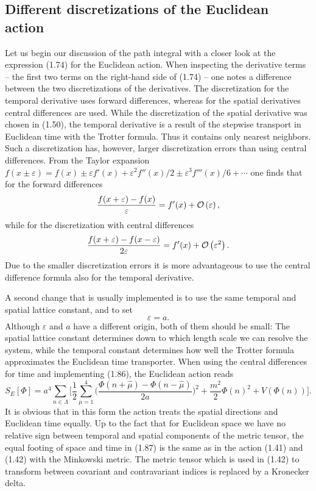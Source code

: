 \subsection{Different discretizations of the Euclidean action}

Let us begin our discussion of the path integral with a closer look at the
expression (1.74) for the Euclidean action. When inspecting the derivative
terms -- the first two terms on the right-hand side of (1.74) -- one notes a
difference between the two discretizations of the derivatives. The
discretization for the temporal derivative uses forward differences, whereas
for the spatial derivatives central differences are used. While the
discretization of the spatial derivative was chosen in (1.50), the temporal
derivative is a result of the stepwise transport in Euclidean time with the
Trotter formula. Thus it contains only nearest neighbors. Such a discretization
has, however, larger discretization errors than using central differences. From
the Taylor expansion $f(x \pm \varepsilon) = f(x) \pm \varepsilon f'(x)
+ \varepsilon^2 f''(x)/2 \pm \varepsilon^3 f'''(x)/6 + \cdots$ one finds that
for the forward differences
\begin{equation}
  \frac{f(x+\varepsilon) - f(x)}{\varepsilon} = f'(x) + \mathcal{O}\left(\varepsilon\right),
\end{equation}
while for the discretization with central differences
\begin{equation}
  \frac{f(x+\varepsilon) - f(x-\varepsilon)}{2\varepsilon}
  = f'(x) + \mathcal{O}\left(\varepsilon^2\right).
\end{equation}
Due to the smaller discretization errors it is more advantageous to use the
central difference formula also for the temporal derivative.

A second change that is usually implemented is to use the same temporal and
spatial lattice constant, and to set
\begin{equation}
  \varepsilon = a.
\end{equation}
Although $\varepsilon$ and $a$ have a different origin, both of them should be
small: The spatial lattice constant determines down to which length scale we
can resolve the system, while the temporal constant determines how well the
Trotter formula approximates the Euclidean time transporter. When using the
central differences for time and implementing (1.86), the Euclidean action
reads
\begin{equation}
  S_E[\Phi] = a^4\sum_{n\in\Lambda}\Big[
    \frac{1}{2}\sum_{\mu=1}^4
      \Big(\frac{\Phi(n+\hat{\mu}) - \Phi(n-\hat{\mu})}{2a}\Big)^2
    + \frac{m^2}{2}\Phi(n)^2 + V(\Phi(n))\Big].
\end{equation}
It is obvious that in this form the action treats the spatial directions and
Euclidean time equally. Up to the fact that for Euclidean space we have no
relative sign between temporal and spatial components of the metric tensor, the
equal footing of space and time in (1.87) is the same as in the action (1.41)
and (1.42) with the Minkowski metric. The metric tensor which is used in (1.42)
to transform between covariant and contravariant indices is replaced by a
Kronecker delta.

